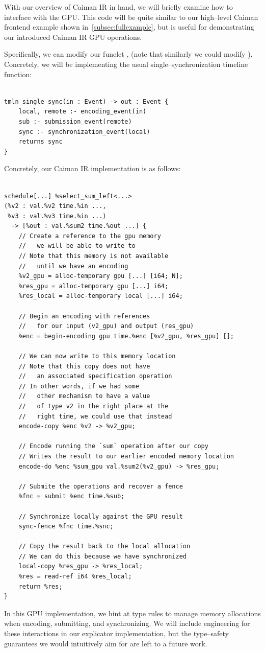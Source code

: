 With our overview of Caiman IR in hand, we will briefly examine how to interface with the GPU.  This code will be quite similar to our high--level Caiman frontend example shown in~\ref{subsec:fullexample}, but is useful for demonstrating our introduced Caiman IR GPU operations.

Specifically, we can modify our funclet , (note that similarly we could modify ).  Concretely, we will be implementing the usual single--synchronization timeline function:
%
\begin{lstlisting}

tmln single_sync(in : Event) -> out : Event {
    local, remote :- encoding_event(in)
    sub :- submission_event(remote)
    sync :- synchronization_event(local)
    returns sync
}
\end{lstlisting}
%
Concretely, our Caiman IR implementation is as follows:
%
\begin{lstlisting}

schedule[...] %select_sum_left<...>
(%v2 : val.%v2 time.%in ..., 
 %v3 : val.%v3 time.%in ...) 
  -> [%out : val.%sum2 time.%out ...] {
    // Create a reference to the gpu memory 
    //   we will be able to write to
    // Note that this memory is not available 
    //   until we have an encoding
    %v2_gpu = alloc-temporary gpu [...] [i64; N];
    %res_gpu = alloc-temporary gpu [...] i64;
    %res_local = alloc-temporary local [...] i64;
    
    // Begin an encoding with references 
    //   for our input (v2_gpu) and output (res_gpu)
    %enc = begin-encoding gpu time.%enc [%v2_gpu, %res_gpu] [];
    
    // We can now write to this memory location
    // Note that this copy does not have 
    //   an associated specification operation
    // In other words, if we had some 
    //   other mechanism to have a value
    //   of type v2 in the right place at the 
    //   right time, we could use that instead
    encode-copy %enc %v2 -> %v2_gpu;
    
    // Encode running the `sum` operation after our copy
    // Writes the result to our earlier encoded memory location
    encode-do %enc %sum_gpu val.%sum2(%v2_gpu) -> %res_gpu;
    
    // Submite the operations and recover a fence
    %fnc = submit %enc time.%sub;
    
    // Synchronize locally against the GPU result
    sync-fence %fnc time.%snc;
    
    // Copy the result back to the local allocation
    // We can do this because we have synchronized
    local-copy %res_gpu -> %res_local;
    %res = read-ref i64 %res_local;
    return %res;
}
\end{lstlisting}
%
In this GPU implementation, we hint at type rules to manage memory allocations when encoding, submitting, and synchronizing.  We will include engineering for these interactions in our explicator implementation, but the type--safety guarantees we would intuitively aim for are left to a future work.

